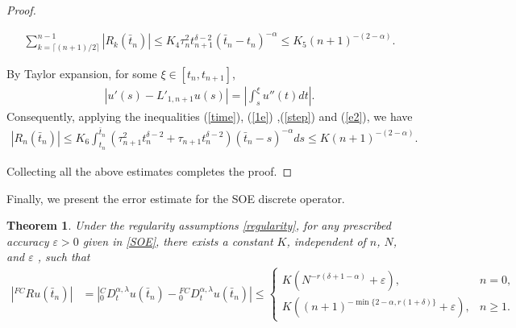 \documentclass[10pt, reqno]{amsart}
\newtheorem{thm}{\bf Theorem}
\newenvironment{theorem}{\begin{thm}} {\end{thm}}
\theoremstyle{remark}
\theoremstyle{definition}
\numberwithin{table}{section}
\begin{document}
\begin{proof}
\begin{description}[leftmargin=0pt, labelindent=0pt]
\begin{align}
\sum_{k=\lceil (n+1)/{2}\rceil}^{n-1}|R_{k}(\bar{t}_n)|\leq K_4\tau_{n}^2t_{n+1}^{\delta-2}(\bar{t}_n-t_{n})^{-\alpha}\leq K_5(n+1)^{-(2-\alpha)}.
\end{align}
\item[Case 4 ($k=n$)]By Taylor expansion, for some $\xi \in [t_n, t_{n+1}]$,
\begin{align}
|u'(s) - L'_{1,n+1}u(s)|
= | \int_s^\xi u''(t)dt |. \label{e2}
\end{align}
Consequently, applying the inequalities (\ref{time}), (\ref{1e}) ,(\ref{step}) and (\ref{e2}), we have
\begin{align}
|R_{n}(\bar{t}_n)|
\leq K_6\int_{t_n}^{\bar{t}_n}(\tau_{n+1}^2t_{n}^{\delta-2}+\tau_{n+1}t_n^{\delta-2}){(\bar{t}_n-s)^{-\alpha}}ds\leq K (n+1)^{-(2-\alpha)}. 
\end{align}
\end{description}
Collecting all the above estimates completes the proof.
\end{proof}
Finally, we present the error estimate for the SOE discrete operator.
\begin{theorem} \label{FRu}
Under the regularity assumptions \eqref{regularity}, for any prescribed accuracy $\varepsilon > 0$ given in \eqref{SOE}, there exists a constant $K$, independent of $n$, $N$, and $\varepsilon$ , such that
    \begin{align}
        |{}^{FC}Ru(\bar{t}_n)|&= |{ }_0^{C}D_t^{\alpha,  \lambda} u(\bar{t}_n)-{ }_0^{FC}D_t^{\alpha,  \lambda} u(\bar{t}_n)|\leq 
        \begin{cases} 
        K(N^{-r(\delta+1-\alpha)}+\varepsilon),&n=0,\\
        K((n+1)^{-\min\{2-\alpha, r(1+\delta)\}}+\varepsilon), &n\geq 1.
        \end{cases}\label{Fhalf}
    \end{align}
\end{theorem}
\end{document}
